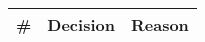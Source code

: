 \begin{longtable}{cXX}
\toprule
\textbf{\#} & \textbf{Decision} & \textbf{Reason} 

\\ \bottomrule
\end{longtable}
